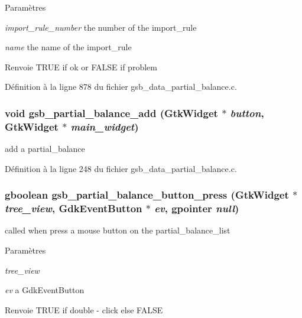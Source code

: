 \begin{DoxyParams}{Paramètres}
\item[{\em import\_\-rule\_\-number}]the number of the import\_\-rule \item[{\em name}]the name of the import\_\-rule\end{DoxyParams}
\begin{DoxyReturn}{Renvoie}
TRUE if ok or FALSE if problem 
\end{DoxyReturn}


Définition à la ligne 878 du fichier gsb\_\-data\_\-partial\_\-balance.c.

\subsubsection[{gsb\_\-partial\_\-balance\_\-add}]{\setlength{\rightskip}{0pt plus 5cm}void gsb\_\-partial\_\-balance\_\-add (GtkWidget $\ast$ {\em button}, \/  GtkWidget $\ast$ {\em main\_\-widget})}\label{gsb__data__partial__balance_8c_a45a38bad71b403cb72573fc296cb6eff}
add a partial\_\-balance 

Définition à la ligne 248 du fichier gsb\_\-data\_\-partial\_\-balance.c.

\subsubsection[{gsb\_\-partial\_\-balance\_\-button\_\-press}]{\setlength{\rightskip}{0pt plus 5cm}gboolean gsb\_\-partial\_\-balance\_\-button\_\-press (GtkWidget $\ast$ {\em tree\_\-view}, \/  GdkEventButton $\ast$ {\em ev}, \/  gpointer {\em null})}\label{gsb__data__partial__balance_8c_a07410f9e80aa69142600b84367d48054}
called when press a mouse button on the partial\_\-balance\_\-list


\begin{DoxyParams}{Paramètres}
\item[{\em tree\_\-view}]\item[{\em ev}]a GdkEventButton\end{DoxyParams}
\begin{DoxyReturn}{Renvoie}
TRUE if double -\/ click else FALSE 
\end{DoxyReturn}


